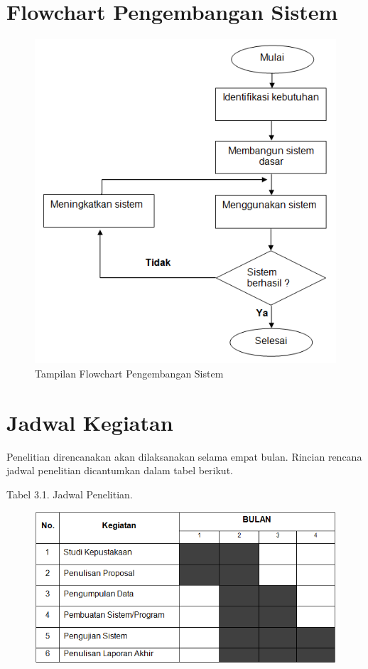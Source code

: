\documentclass{jtetiproposalskripsi}
\begin{document}
\section{Flowchart Pengembangan Sistem}
\begin{figure}[h]
\centering 
 \includegraphics[width=1\textwidth]{gambar/2}  
 \caption{Tampilan Flowchart Pengembangan Sistem}
\end{figure}
\newpage
\section{Jadwal Kegiatan}
Penelitian direncanakan akan dilaksanakan selama empat bulan. Rincian rencana jadwal penelitian dicantumkan dalam tabel berikut.

\begin{center}
Tabel 3.1. Jadwal Penelitian.
\end{center}
\vspace{-0.5cm}
\begin{figure}[ht!]
  \centering
    \includegraphics[width=13cm]{gambar/3}
\end{figure}
\end{document}
